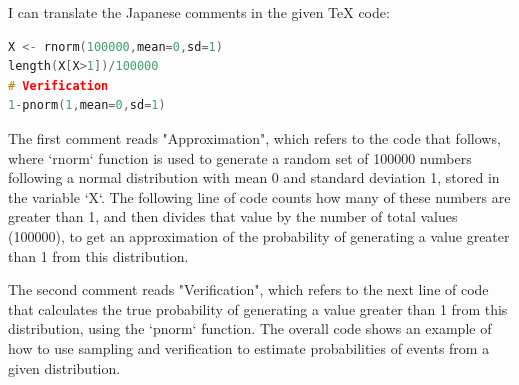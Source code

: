 I can translate the Japanese comments in the given TeX code:

\begin{lstlisting}[language=c++,label={code:25_01},caption={Approximation and Verification}]
X <- rnorm(100000,mean=0,sd=1)
length(X[X>1])/100000
# Verification
1-pnorm(1,mean=0,sd=1)
\end{lstlisting}

The first comment reads "Approximation", which refers to the code that follows, where `rnorm` function is used to generate a random set of 100000 numbers following a normal distribution with mean 0 and standard deviation 1, stored in the variable `X`. The following line of code counts how many of these numbers are greater than 1, and then divides that value by the number of total values (100000), to get an approximation of the probability of generating a value greater than 1 from this distribution.

The second comment reads "Verification", which refers to the next line of code that calculates the true probability of generating a value greater than 1 from this distribution, using the `pnorm` function. The overall code shows an example of how to use sampling and verification to estimate probabilities of events from a given distribution.

